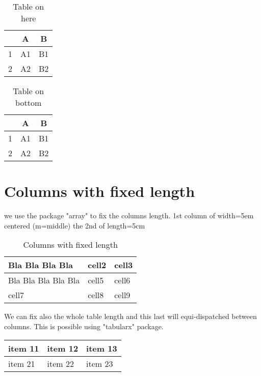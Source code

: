 \begin{table}[h]
	\centering
	\begin{tabular}{ |c|c|c| } 
		\hline
		& A & B \\
		\hline \hline
		1 & A1 & B1 \\ 
		\hline
		2 & A2 & B2 \\ 
		\hline
	\end{tabular}
	\caption{Table on here }
	\label{tab:table0}
\end{table}

\begin{table}[b]
	\centering
	\begin{tabular}{ |c|c|c| } 
		\hline
		& A & B \\
		\hline \hline
		1 & A1 & B1 \\ 
		\hline
		2 & A2 & B2 \\ 
		\hline
	\end{tabular}
	\caption{Table on bottom }
	\label{tab:table0}
\end{table}
\newpage
\section{Columns with fixed length} 
we use the package "array" to fix the columns length. 1st column of width=5em centered (m=middle) the 2nd of length=5cm
\begin{table}[H]
	\begin{center}
		\begin{tabular}{ | m{5em} | m{5cm}| m{1cm} | } 
			\hline
			Bla Bla Bla Bla & cell2 & cell3 \\ 
			\hline
			Bla Bla Bla Bla Bla  & cell5 & cell6 \\ 
			\hline
			cell7 & cell8 & cell9 \\ 
			\hline
		\end{tabular}
	\end{center}
	\caption{Columns with fixed length}
\end{table}

We can fix also the whole table length and this last will equi-dispatched between columns. This is possible using "tabularx" package.
\begin{tabularx}{0.8\textwidth} { 
		| >{\raggedright\arraybackslash}X 
		| >{\centering\arraybackslash}X 
		| >{\raggedleft\arraybackslash}X | }
	\hline
	item 11 & item 12 & item 13 \\
	\hline
	item 21  & item 22  & item 23  \\
	\hline
\end{tabularx}
